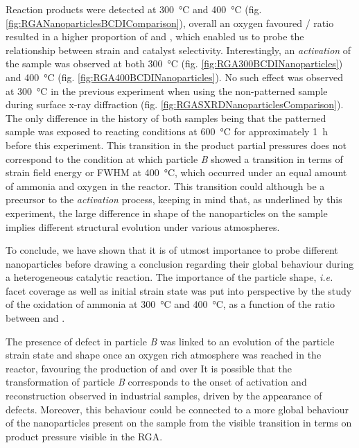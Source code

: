 Reaction products were detected at \qty{300}{\degreeCelsius} and \qty{400}{\degreeCelsius} (fig. \ref{fig:RGANanoparticlesBCDIComparison}), overall an oxygen favoured / ratio resulted in a higher proportion of  and , which enabled us to probe the relationship between strain and catalyst selectivity.
Interestingly, an \textit{activation} of the sample was observed at both \qty{300}{\degreeCelsius} (fig. \ref{fig:RGA300BCDINanoparticles}) and \qty{400}{\degreeCelsius} (fig. \ref{fig:RGA400BCDINanoparticles}).
No such effect was observed at \qty{300}{\degreeCelsius} in the previous experiment when using the non-patterned sample during surface x-ray diffraction (fig. \ref{fig:RGASXRDNanoparticlesComparison}).
The only difference in the history of both samples being that the patterned sample was exposed to reacting conditions at \qty{600}{\degreeCelsius} for approximately \qty{1}{\hour} before this experiment.
This transition in the product partial pressures does not correspond to the condition at which particle \textit{B} showed a transition in terms of strain field energy or FWHM at \qty{400}{\degreeCelsius}, which occurred under an equal amount of ammonia and oxygen in the reactor.
This transition could although be a precursor to the \textit{activation} process, keeping in mind that, as underlined by this experiment, the large difference in shape of the nanoparticles on the sample implies different structural evolution under various atmospheres.

To conclude, we have shown that it is of utmost importance to probe different nanoparticles before drawing a conclusion regarding their global behaviour during a heterogeneous catalytic reaction.
The importance of the particle shape, \textit{i.e.} facet coverage as well as initial strain state was put into perspective by the study of the oxidation of ammonia at \qty{300}{\degreeCelsius} and \qty{400}{\degreeCelsius}, as a function of the ratio between  and \ammonia.

The presence of defect in particle \textit{B} was linked to an evolution of the particle strain state and shape once an oxygen rich atmosphere was reached in the reactor, favouring the production of  and  over 
It is possible that the transformation of particle \textit{B} corresponds to the onset of activation and reconstruction observed in industrial samples, driven by the appearance of defects.
Moreover, this behaviour could be connected to a more global behaviour of the nanoparticles present on the sample from the visible transition in terms on product pressure visible in the RGA.

